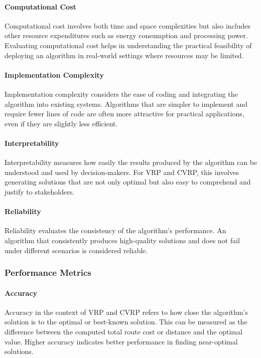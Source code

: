 \documentclass[
]{article}
\begin{document}
  \paragraph{Computational Cost} Computational cost involves both time and space complexities but also includes other resource expenditures such as energy consumption and processing power. Evaluating computational cost helps in understanding the practical feasibility of deploying an algorithm in real-world settings where resources may be limited.
  
  \paragraph{Implementation Complexity} Implementation complexity considers the ease of coding and integrating the algorithm into existing systems. Algorithms that are simpler to implement and require fewer lines of code are often more attractive for practical applications, even if they are slightly less efficient.
  
  \paragraph{Interpretability} Interpretability measures how easily the results produced by the algorithm can be understood and used by decision-makers. For VRP and CVRP, this involves generating solutions that are not only optimal but also easy to comprehend and justify to stakeholders.
  
  \paragraph{Reliability} Reliability evaluates the consistency of the algorithm’s performance. An algorithm that consistently produces high-quality solutions and does not fail under different scenarios is considered reliable.
  
  \subsubsection{Performance Metrics}
  
  \paragraph{Accuracy} Accuracy in the context of VRP and CVRP refers to how close the algorithm’s solution is to the optimal or best-known solution. This can be measured as the difference between the computed total route cost or distance and the optimal value. Higher accuracy indicates better performance in finding near-optimal solutions.
  
\end{document}
